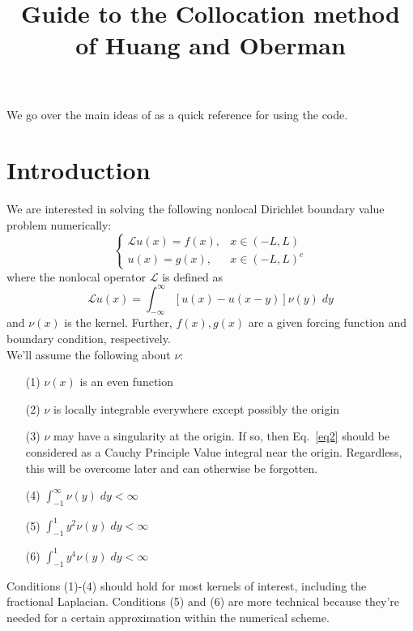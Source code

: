 \documentclass[pra,onecolumn,superscriptaddress,aps]{revtex4}
\begin{document}
\title{Guide to the Collocation method of Huang and Oberman}


\maketitle
       
We go over the main ideas of \cite{Oberman} as a quick reference for using the code.

\section{Introduction}  
We are interested in solving the following nonlocal Dirichlet boundary value problem numerically:
\begin{equation}
\begin{cases}
\mathcal{L}u(x) = f(x), & x \in (-L, L) \\
u(x) = g(x), & x \in (-L,L)^c
\end{cases}
\end{equation}
where the nonlocal operator $\mathcal{L}$ is defined as
\begin{equation} 
\mathcal{L}u(x) = \int^\infty_{-\infty} [u(x) - u(x-y)] \nu(y) \; dy
\label{eq2}
\end{equation}
and $\nu(x)$ is the kernel. Further, $f(x), g(x)$ are a given forcing function and boundary condition, respectively. \\

We'll assume the following about $\nu$:
\begin{itemize}
\item[(1)] $\nu(x)$ is an even function
\item[(2)] $\nu$ is locally integrable everywhere except possibly the origin
\item[(3)] $\nu$ may have a singularity at the origin. If so, then Eq.~\eqref{eq2} should be considered as a Cauchy Principle Value integral near the origin. Regardless, this will be overcome later and can otherwise be forgotten.
\item[(4)] $\int^\infty_{-1} \nu(y) \; dy < \infty$
\item[(5)] $\int^1_{-1} y^2 \nu(y) \; dy < \infty$
\item[(6)] $\int^1_{-1} y^4 \nu(y) \; dy < \infty$
\end{itemize}

Conditions (1)-(4) should hold for most kernels of interest, including the fractional Laplacian. Conditions (5) and (6) are more technical because they're needed for a certain approximation within the numerical scheme.\\
\end{document}
